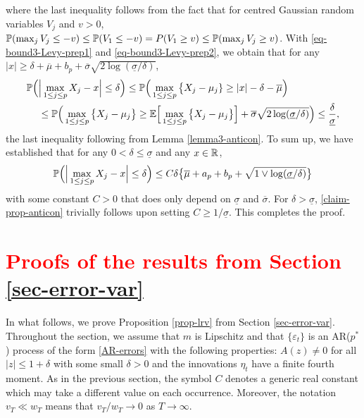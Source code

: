 where the last inequality follows from the fact that for centred Gaussian random variables $V_j$ and $v > 0$, $\mathbb{P}(\max_j V_j \le -v) \le \mathbb{P}(V_1 \le -v) = P(V_1 \ge v) \le \mathbb{P}(\max_j V_j \ge v)$. With \eqref{eq-bound3-Levy-prep1} and \eqref{eq-bound3-Levy-prep2}, we obtain that for any $|x| \ge \delta + \overline{\mu} + b_p + \overline{\sigma}\sqrt{2\log(\underline{\sigma}/\delta)}$,
\begin{align*} 
\mathbb{P} \Big( & \Big| \max_{1 \le j \le p} X_j - x \Big| \le \delta \Big) \le \mathbb{P} \Big( \max_{1 \le j \le p} \big\{ X_j - \mu_j \} \ge |x| - \delta - \overline{\mu} \Big) \\
 & \le \mathbb{P} \Big( \max_{1 \le j \le p} \big\{ X_j - \mu_j \big\} \ge \mathbb{E} \Big[ \max_{1 \le j \le p} \big\{ X_j-\mu_j \big\} \Big] + \overline{\sigma} \sqrt{2\log(\underline{\sigma}/\delta)} \Big) \le \frac{\delta}{\underline{\sigma}}, 
\end{align*}
the last inequality following from Lemma \ref{lemma3-anticon}. To sum up, we have established that for any $0 < \delta \le \underline{\sigma}$ and any $x \in \mathbb{R}$, 
\begin{equation}\label{claim-prop-anticon}
\mathbb{P} \Big( \Big| \max_{1 \le j \le p} X_j - x \Big| \le \delta \Big) \le C \delta \big\{ \overline{\mu} + a_p + b_p + \sqrt{1 \vee \log(\underline{\sigma}/\delta)} \big\} 
\end{equation}
with some constant $C > 0$ that does only depend on $\underline{\sigma}$ and $\overline{\sigma}$. For $\delta > \underline{\sigma}$, \eqref{claim-prop-anticon} trivially follows upon setting $C \ge 1/\underline{\sigma}$. This completes the proof. 



\section{\textcolor{red}{Proofs of the results from Section \ref{sec-error-var}}}\label{sec-supp-proofs2}


In what follows, we prove Proposition \ref{prop-lrv} from Section \ref{sec-error-var}. Throughout the section, we assume that $m$ is Lipschitz and that $\{\varepsilon_t\}$ is an AR($p^*$) process of the form \eqref{AR-errors} with the following properties: $A(z) \ne 0$ for all $|z| \le 1 + \delta$ with some small $\delta > 0$ and the innovations $\eta_t$ have a finite fourth moment. As in the previous section, the symbol $C$ denotes a generic real constant which may take a different value on each occurrence. Moreover, the notation $v_T \ll w_T$ means that $v_T/w_T \rightarrow 0$ as $T \rightarrow \infty$.  



